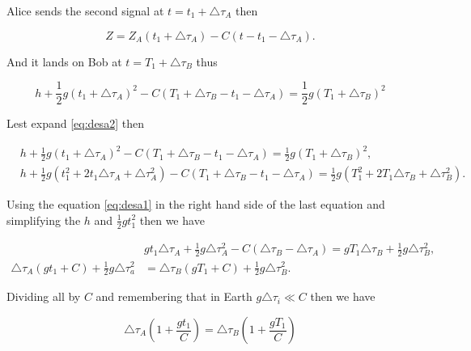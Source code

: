             Alice sends the second signal at $t = t_1 + \triangle \tau_A$ then

            \begin{equation}
                Z = Z_A(t_1 + \triangle \tau_A) - C(t - t_1 - \triangle\tau_A).
            \end{equation}

            And it lands on Bob at $t = T_1 + \triangle \tau_B$ thus

            \begin{equation}\label{eq:desa2}
                h + \frac{1}{2}g(t_1 + \triangle\tau_A)^2 - C(T_1 + \triangle \tau_B - t_1 - \triangle\tau_A) = \frac{1}{2}g(T_1 + \triangle\tau_B)^2
            \end{equation}

            Lest expand \ref{eq:desa2} then

            \begin{align}
                &h + \frac{1}{2}g(t_1+\triangle\tau_A)^2 - C(T_1 + \triangle\tau_B - t_1 - \triangle\tau_A) = \frac{1}{2}g(T_1 + \triangle\tau_B)^2,\\
                &h + \frac{1}{2}g(t_1^2 + 2t_1\triangle\tau_A + \triangle\tau_A^2) - C(T_1 + \triangle\tau_B - t_1 - \triangle\tau_A) = \frac{1}{2}g(T_1^2 + 2T_1\triangle\tau_B + \triangle\tau_B^2).
            \end{align}

            Using the equation \ref{eq:desa1} in the right hand side of the last equation and simplifying the $h$ and $\frac{1}{2}gt_1^2$ then we have

            \begin{align*}
                &gt_1\triangle\tau_A + \frac{1}{2}g\triangle\tau_A^2 - C(\triangle\tau_B - \triangle\tau_A) = gT_1\triangle\tau_B + \frac{1}{2}g\triangle\tau_B^2,\\
                \triangle\tau_A(gt_1+C) + \frac{1}{2}g\triangle\tau_a^2 &= \triangle\tau_B(gT_1 + C) + \frac{1}{2}g\triangle\tau_B^2.
            \end{align*}

            Dividing all by $C$ and remembering that in Earth $g\triangle\tau_i \ll C$ then we have

            \begin{equation}
                \triangle \tau_A \left(1 + \frac{gt_1}{C}\right) = \triangle\tau_B\left(1 + \frac{gT_1}{C}\right)
            \end{equation}

